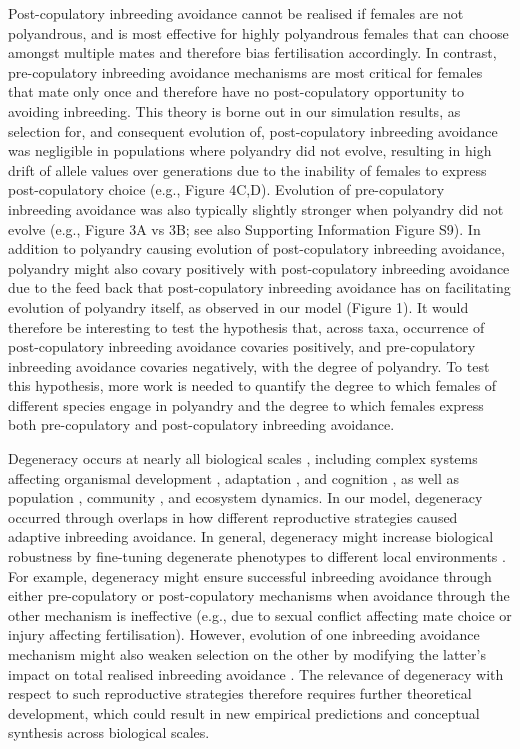\documentclass[10pt,letterpaper]{article}
\begin{document}
Post-copulatory inbreeding avoidance cannot be realised if females are not polyandrous, and is most effective for highly polyandrous females that can choose amongst multiple mates and therefore bias fertilisation accordingly. In contrast, pre-copulatory inbreeding avoidance mechanisms are most critical for females that mate only once and therefore have no post-copulatory opportunity to avoiding inbreeding. This theory is borne out in our simulation results, as selection for, and consequent evolution of, post-copulatory inbreeding avoidance was negligible in populations where polyandry did not evolve, resulting in high drift of allele values over generations due to the inability of females to express post-copulatory choice (e.g., Figure 4C,D). Evolution of pre-copulatory inbreeding avoidance was also typically slightly stronger when polyandry did not evolve (e.g., Figure 3A vs 3B; see also Supporting Information Figure S9). In addition to polyandry causing evolution of post-copulatory inbreeding avoidance, polyandry might also covary positively with post-copulatory inbreeding avoidance due to the feed back that post-copulatory inbreeding avoidance has on facilitating evolution of polyandry itself, as observed in our model (Figure 1). It would therefore be interesting to test the hypothesis that, across taxa, occurrence of post-copulatory inbreeding avoidance covaries positively, and pre-copulatory inbreeding avoidance covaries negatively, with the degree of polyandry. To test this hypothesis, more work is needed to quantify the degree to which females of different species engage in polyandry and the degree to which females express both pre-copulatory and post-copulatory inbreeding avoidance.

Degeneracy occurs at nearly all biological scales \cite[][]{Edelman2001}, including complex systems affecting organismal development \cite[e.g.,][]{Nowak1997}, adaptation \cite[][]{Whitacre2010, Whitacre2010a}, and cognition \cite[][]{Price2002, Park2013}, as well as population \cite[][]{Atamas2009}, community \cite[][]{Suraci2017}, and ecosystem \cite[e.g.,][]{Levin2008} dynamics. In our model, degeneracy occurred through overlaps in how different reproductive strategies caused adaptive inbreeding avoidance. In general, degeneracy might increase biological robustness by fine-tuning degenerate phenotypes to different local environments \cite[][]{Gardner2006, Whitacre2010a}. For example, degeneracy might ensure successful inbreeding avoidance through either pre-copulatory or post-copulatory mechanisms when avoidance through the other mechanism is ineffective (e.g., due to sexual conflict affecting mate choice or injury affecting fertilisation). However, evolution of one inbreeding avoidance mechanism might also weaken selection on the other by modifying the latter's impact on total realised inbreeding avoidance \cite[\textit{sensu} evolution of genetic redundancy; see][]{Nowak1997}. The relevance of degeneracy with respect to such reproductive strategies therefore requires further theoretical development, which could result in new empirical predictions and conceptual synthesis across biological scales. 
\end{document}
